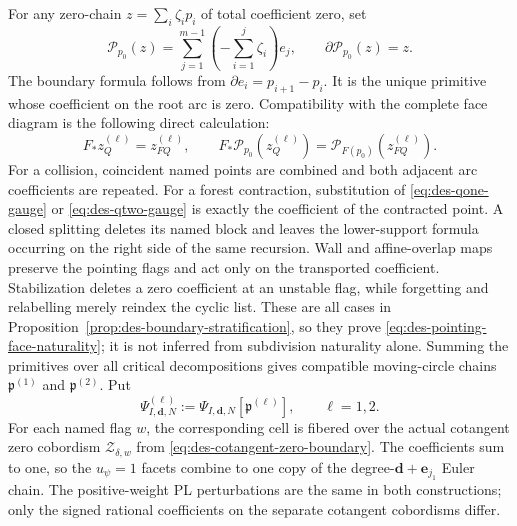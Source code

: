 For any zero-chain $z=\sum_i\zeta_ip_i$ of total coefficient zero, set
\begin{equation}
 \mathcal P_{p_0}(z)=\sum_{j=1}^{m-1}
   \left(-\sum_{i=1}^{j}\zeta_i\right)e_j,
 \qquad \partial\mathcal P_{p_0}(z)=z.
 \label{eq:des-moving-circle-primitive}
\end{equation}
The boundary formula follows from $\partial e_i=p_{i+1}-p_i$.  It is the
unique primitive whose coefficient on the root arc is zero.  Compatibility
with the complete face diagram is the following direct calculation:
\begin{equation}
 F_*z_Q^{(\ell)}=z_{FQ}^{(\ell)},\qquad
 F_*\mathcal P_{p_0}(z_Q^{(\ell)})
 =\mathcal P_{F(p_0)}(z_{FQ}^{(\ell)}).
 \label{eq:des-pointing-face-naturality}
\end{equation}
For a collision, coincident named points are combined and both adjacent arc
coefficients are repeated.  For a forest contraction, substitution of
\eqref{eq:des-qone-gauge} or \eqref{eq:des-qtwo-gauge} is exactly the
coefficient of the contracted point.  A closed splitting deletes its named
block and leaves the lower-support formula occurring on the right side of the
same recursion.  Wall and affine-overlap maps preserve the pointing flags and
act only on the transported coefficient.  Stabilization deletes a zero
coefficient at an unstable flag, while forgetting and relabelling merely
reindex the cyclic list.  These are all cases in
Proposition~\ref{prop:des-boundary-stratification}, so they prove
\eqref{eq:des-pointing-face-naturality}; it is not inferred from subdivision
naturality alone.  Summing the primitives over all critical decompositions
gives compatible moving-circle chains
$\mathfrak p^{(1)}$ and $\mathfrak p^{(2)}$.  Put
\begin{equation}
 \Psi^{(\ell)}_{I,\mathbf d,N}
 :=\Psi_{I,\mathbf d,N}[\mathfrak p^{(\ell)}],\qquad \ell=1,2.
 \label{eq:des-two-pointing-chains}
\end{equation}
For each named flag $w$, the corresponding cell is fibered over the actual
cotangent zero cobordism $\mathcal Z_{\delta,w}$ from
\eqref{eq:des-cotangent-zero-boundary}.  The coefficients sum to one, so the
$u_\psi=1$ facets combine to one copy of the
degree-$\mathbf d+\mathbf e_{j_1}$ Euler chain.  The positive-weight PL
perturbations are the same in both constructions; only the signed rational
coefficients on the separate cotangent cobordisms differ.

